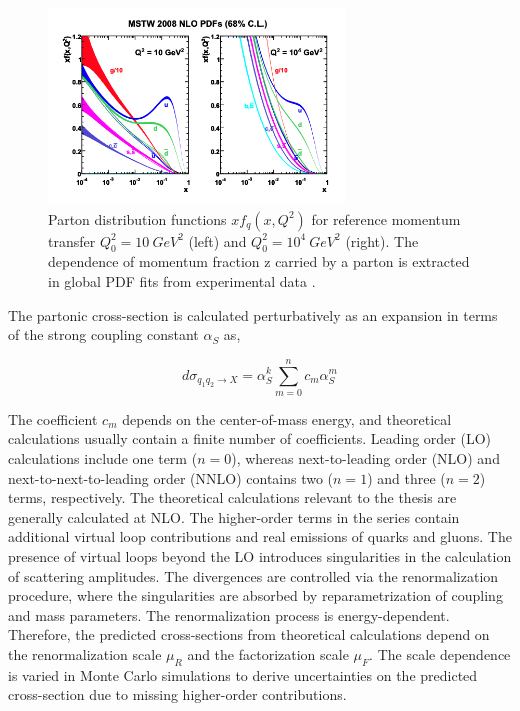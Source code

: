 \begin{figure}
\centering
    \includegraphics[width=0.7\textwidth] {figures/Theory/PDF.pdf}\hspace{1cm}
    \caption{ Parton distribution functions $xf_{q}(x,Q^2)$ for reference momentum transfer $Q^2_{0} = 10 ~ GeV^2$ (left) and $Q^2_{0} = 10^4~ GeV^{2}$ (right). The dependence of momentum fraction z carried by a parton is extracted in global PDF fits from experimental data \cite{PDFCalLHC}.}
\label{fig:PDFFig}
\end{figure}

The partonic cross-section is calculated perturbatively as an expansion in terms of the strong coupling constant $\alpha_{S}$ as,

\begin{equation}
\label{eqn:PartonicXS}
d\sigma_{q_{1}q_{2}\rightarrow X} = \alpha_{S}^{k} \sum_{m=0}^{n} c_{m}\alpha_{S}^{m}
\end{equation}

The coefficient $c_{m}$ depends on the center-of-mass energy, and theoretical calculations usually contain a finite number of coefficients. Leading order (LO) calculations include one term ($n=0$), whereas next-to-leading order (NLO) and next-to-next-to-leading order (NNLO) contains two ($n=1$) and three ($n=2$) terms, respectively. The theoretical calculations relevant to the thesis are generally calculated at NLO. The higher-order terms in the series contain additional virtual loop contributions and real emissions of quarks and gluons. The presence of virtual loops beyond the LO introduces singularities in the calculation of scattering amplitudes. The divergences are controlled via the renormalization procedure, where the singularities are absorbed by reparametrization of coupling and mass parameters. The renormalization process is energy-dependent. Therefore, the predicted cross-sections from theoretical calculations depend on the renormalization scale $\mu_{R}$ and the factorization scale $\mu_{F}$. The scale dependence is varied in Monte Carlo simulations to derive uncertainties on the predicted cross-section due to missing higher-order contributions. 

